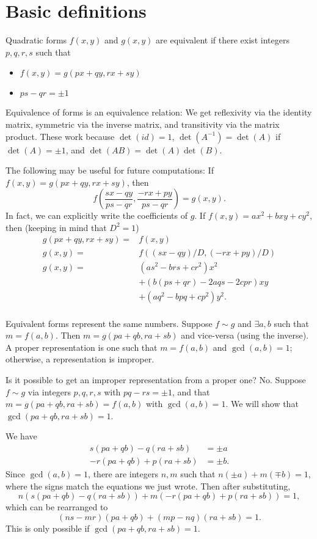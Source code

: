 

\section{Basic definitions}
Quadratic forms $f(x,y)$ and $g(x,y)$ are equivalent if there exist integers $p,q,r,s$ such that
\begin{itemize}
\item $f(x,y) = g(px+qy,rx+sy)$
\item $ps-qr = \pm 1$
\end{itemize}

Equivalence of forms is an equivalence relation: We get reflexivity via the identity matrix, symmetric via the inverse matrix, and transitivity via the matrix product. These work because $\det(id) = 1$, $\det(A^{-1}) = \det(A)$ if $\det(A) = \pm 1$, and $\det(AB)=\det(A)\det(B)$.

The following may be useful for future computations: If $f(x,y) = g(px+qy,rx+sy)$, then
\[f\left(\frac{sx-qy}{ps-qr}, \frac{-rx+py}{ps-qr}\right) = g(x,y).\]
In fact, we can explicitly write the coefficients of $g$. If $f(x,y)=ax^2+bxy+cy^2$, then (keeping in mind that $D^2=1$)
\begin{align*}
g(px+qy, rx+sy) =& f(x,y)\\
g(x,y) =& f((sx-qy)/D, (-rx+py)/D)\\
g(x,y) =& (as^2-brs+cr^2)x^2\\
        & + (b(ps+qr)-2aqs-2cpr)xy\\
        & + (aq^2-bpq+cp^2)y^2.\\
\end{align*}

Equivalent forms represent the same numbers. Suppose $f \sim g$ and $\exists a,b$ such that $m=f(a,b)$. Then $m=g(pa+qb, ra+sb)$ and vice-versa (using the inverse). A proper representation is one such that $m=f(a,b)$ and $\gcd(a,b)=1$; otherwise, a representation is improper.

Is it possible to get an improper representation from a proper one? No. Suppose $f \sim g$ via integers $p,q,r,s$ with $pq-rs=\pm 1$, and that $m = g(pa+qb, ra+sb) = f(a,b)$ with $\gcd(a,b)=1$. We will show that $\gcd(pa+qb, ra+sb)=1$.

We have
\begin{align*}
s(pa+qb)-q(ra+sb)&=\pm a\\
-r(pa+qb)+p(ra+sb)&=\pm b.
\end{align*}
Since $\gcd(a,b)=1$, there are integers $n,m$ such that $n(\pm a)+m(\mp b)=1$, where the signs match the equations we just wrote. Then after substituting,
\[n(s(pa+qb)-q(ra+sb)) + m(-r(pa+qb)+p(ra+sb)) = 1,\]
which can be rearranged to
\[(ns-mr)(pa+qb) + (mp-nq)(ra+sb) = 1.\]
This is only possible if $\gcd(pa+qb, ra+sb)=1$.

